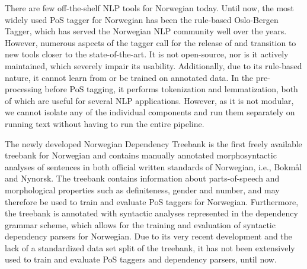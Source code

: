 \documentclass[a4paper,12pt,english]{book}
\begin{document}
There are few off-the-shelf NLP tools for Norwegian today. Until now, the most
widely used PoS tagger for Norwegian has been the rule-based Oslo-Bergen
Tagger, which has served the Norwegian NLP community well over the years.
However, numerous aspects of the tagger call for the release of and transition
to new tools closer to the state-of-the-art. It is not open-source, nor is it
actively maintained, which severely impair its usability. Additionally, due to
its rule-based nature, it cannot learn from or be trained on annotated data. In
the pre-processing before PoS tagging, it performs tokenization and
lemmatization, both of which are useful for several NLP applications. However,
as it is not modular,
we cannot isolate any of the individual components and run them separately on
running text without having to run the entire pipeline.


The newly developed Norwegian Dependency Treebank is the first freely available
treebank for Norwegian and contains manually annotated morphosyntactic analyses
of sentences in both official written standards of Norwegian, i.e., Bokmål and
Nynorsk. The treebank contains information about parts-of-speech and
morphological properties such as definiteness, gender and number, and may
therefore be used to train and evaluate PoS taggers for Norwegian. Furthermore,
the treebank is annotated with syntactic analyses represented in the dependency
grammar scheme, which allows for the training and evaluation of syntactic
dependency parsers for Norwegian. Due to its very recent development and the
lack of a standardized data set split of the treebank, it has not been
extensively used to train and evaluate PoS taggers and dependency parsers,
until now.
\end{document}
